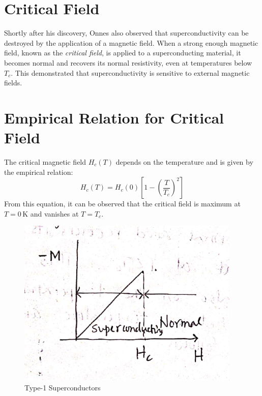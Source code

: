 \documentclass{article}
\begin{document}
\section{Critical Field}

Shortly after his discovery, Onnes also observed that superconductivity can be destroyed by the application of a magnetic field. When a strong enough magnetic field, known as the \emph{critical field}, is applied to a superconducting material, it becomes normal and recovers its normal resistivity, even at temperatures below \(T_c\). This demonstrated that superconductivity is sensitive to external magnetic fields.

\section{Empirical Relation for Critical Field}

The critical magnetic field \(H_c(T)\) depends on the temperature and is given by the empirical relation:
\[
H_c(T) = H_c(0) \left[ 1 - \left( \frac{T}{T_c} \right)^2 \right]
\]
From this equation, it can be observed that the critical field is maximum at \(T = 0 \, \text{K}\) and vanishes at \(T = T_c\).

\begin{figure}
    \begin{center}
        \includegraphics[width=0.95\textwidth]{figures/3.png}
    \end{center}
    \caption{Type-1 Superconductors}\label{fig:}
\end{figure}
\end{document}
